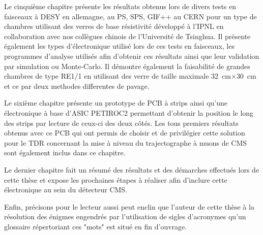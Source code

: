 Le cinquième chapitre présente les résultats obtenus lors de divers tests en faisceaux à DESY en allemagne, au PS, SPS, GIF++ au CERN pour un type de chambres utilisant des verres de base résistivité développé à l'IPNL en collaboration avec nos collègues chinois de l'Université de Tsinghua. Il présente également les types d'électronique utilisé lors de ces tests en faisceaux, les programmes d'analyse utilisés afin d'obtenir ces résultats ainsi que leur validation par simulation ou Monte-Carlo. Il démontre également la faisabilité de grandes chambres de type RE1/1 en utilisant des verre de taille maximale \SI{32}{\centi\meter}$\times$\SI{30}{\centi\meter} et ce par deux methodes differentes de pavage.

Le sixième chapitre présente un prototype de PCB à strips ainsi qu'une électronique à base d'ASIC PETIROC2 permettant d'obtenir la position le long des strips par lecture de ceux-ci des deux côtés. Les tous premiers résultats obtenus avec ce PCB qui ont permis de choisir et de privilégier cette solution pour le TDR concernant la mise à niveau du trajectographe à muons de CMS sont également inclus dans ce chapitre.

Le dernier chapitre fait un résumé des résultats et des démarches effectués lors de cette thèse et expose les prochaines étapes à réaliser afin d'inclure cette électronique au sein du détecteur CMS.

Enfin, précisons pour le lecteur aussi peut enclin que l'auteur de cette thèse à la résolution des énigmes engendrés par l'utilisation de sigles  d'acronymes qu'un glossaire répertoriant ces "mots" est situé en fin d'ouvrage.


